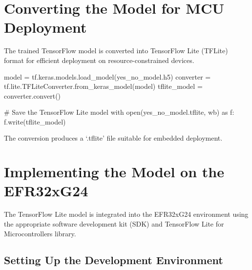 \documentclass[
  9pt,
  letterpaper,
  abstract,
  titlepage]{scrbook}
\newenvironment{Shaded}{\begin{snugshade}}{\end{snugshade}}
\newcommand{\CharTok}[1]{\textcolor[rgb]{0.13,0.47,0.30}{#1}}
\newcommand{\ErrorTok}[1]{\textcolor[rgb]{0.68,0.00,0.00}{#1}}
\newcommand{\NormalTok}[1]{\textcolor[rgb]{0.00,0.23,0.31}{#1}}
\newcommand{\OperatorTok}[1]{\textcolor[rgb]{0.37,0.37,0.37}{#1}}
\newcommand{\PreprocessorTok}[1]{\textcolor[rgb]{0.68,0.00,0.00}{#1}}
\begin{document}
\section{Converting the Model for MCU
Deployment}\label{converting-the-model-for-mcu-deployment}

The trained TensorFlow model is converted into TensorFlow Lite (TFLite)
format for efficient deployment on resource-constrained devices.

\begin{Shaded}
\begin{Highlighting}[]
\NormalTok{model }\OperatorTok{=}\NormalTok{ tf}\OperatorTok{.}\NormalTok{keras}\OperatorTok{.}\NormalTok{models}\OperatorTok{.}\NormalTok{load\_model}\OperatorTok{(}\CharTok{\textquotesingle{}y}\ErrorTok{es\_no\_model.h5}\CharTok{\textquotesingle{}}\OperatorTok{)}
\NormalTok{converter }\OperatorTok{=}\NormalTok{ tf}\OperatorTok{.}\NormalTok{lite}\OperatorTok{.}\NormalTok{TFLiteConverter}\OperatorTok{.}\NormalTok{from\_keras\_model}\OperatorTok{(}\NormalTok{model}\OperatorTok{)}
\NormalTok{tflite\_model }\OperatorTok{=}\NormalTok{ converter}\OperatorTok{.}\NormalTok{convert}\OperatorTok{()}

\PreprocessorTok{\# }\ErrorTok{Save the TensorFlow Lite model}
\NormalTok{with open}\OperatorTok{(}\CharTok{\textquotesingle{}y}\ErrorTok{es\_no\_model.tflite}\CharTok{\textquotesingle{}}\OperatorTok{,} \CharTok{\textquotesingle{}w}\ErrorTok{b}\CharTok{\textquotesingle{}}\OperatorTok{)}\NormalTok{ as f}\OperatorTok{:}
\NormalTok{    f}\OperatorTok{.}\NormalTok{write}\OperatorTok{(}\NormalTok{tflite\_model}\OperatorTok{)}
\end{Highlighting}
\end{Shaded}

The conversion produces a `.tflite' file suitable for embedded
deployment.

\section{Implementing the Model on the
EFR32xG24}\label{implementing-the-model-on-the-efr32xg24}

The TensorFlow Lite model is integrated into the EFR32xG24 environment
using the appropriate software development kit (SDK) and TensorFlow Lite
for Microcontrollers library.

\subsection{Setting Up the Development
Environment}\label{setting-up-the-development-environment}
\end{document}

